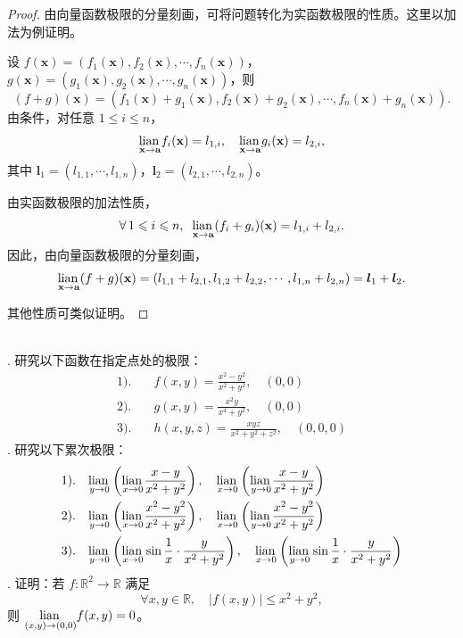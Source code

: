 \documentclass[12pt,UTF8,fontset=none]{ctexbook}
\begin{document}
\begin{proof}
由向量函数极限的分量刻画，可将问题转化为实函数极限的性质。这里以加法为例证明。

设 $f(\mathbf{x}) = (f_1(\mathbf{x}), f_2(\mathbf{x}), \cdots, f_n(\mathbf{x}))$，$g(\mathbf{x}) = (g_1(\mathbf{x}), g_2(\mathbf{x}), \cdots, g_n(\mathbf{x}))$，则
$$ (f + g)(\mathbf{x}) = (f_1(\mathbf{x}) + g_1(\mathbf{x}), f_2(\mathbf{x}) + g_2(\mathbf{x}), \cdots, f_n(\mathbf{x}) + g_n(\mathbf{x})). $$
由条件，对任意 $1 \leqslant i \leqslant n$，
$$ \underset{\mathbf{x}\to \mathbf{a}}{\operatorname{lian}\,} f_i(\mathbf{x}) = l_{1,i}, \quad \underset{\mathbf{x}\to \mathbf{a}}{\operatorname{lian}\,} g_i(\mathbf{x}) = l_{2,i}, $$
其中 $\boldsymbol{l}_1 = (l_{1,1}, \cdots, l_{1,n})$，$\boldsymbol{l}_2 = (l_{2,1}, \cdots, l_{2,n})$。

由实函数极限的加法性质，
$$ \forall \, 1 \leqslant i \leqslant n, \;\; \underset{\mathbf{x}\to \mathbf{a}}{\operatorname{lian}\,} (f_i + g_i)(\mathbf{x}) = l_{1,i} + l_{2,i}. $$
因此，由向量函数极限的分量刻画，
$$ \underset{\mathbf{x}\to \mathbf{a}}{\operatorname{lian}\,} (f + g)(\mathbf{x}) = (l_{1,1} + l_{2,1}, l_{1,2} + l_{2,2}, \cdots, l_{1,n} + l_{2,n}) = \boldsymbol{l}_1 + \boldsymbol{l}_2. $$

其他性质可类似证明。
\end{proof}

\begin{xt}
\mbox{} \\
. 研究以下函数在指定点处的极限：
\begin{align*}
1).& \quad f(x, y) = \frac{x^2-y^2}{x^2+y^2}, \quad (0, 0) \\
2).& \quad g(x, y) = \frac{x^2y}{x^4+y^2}, \quad (0, 0) \\
3).& \quad h(x, y, z) = \frac{xyz}{x^2+y^2+z^2}, \quad (0, 0, 0)
\end{align*}
. 研究以下累次极限：
\begin{align*}
1).& \quad \underset{y\to 0}{\operatorname{lian}\,} \left(\underset{x\to 0}{\operatorname{lian}\,} \frac{x-y}{x^2+y^2}\right), \quad \underset{x\to 0}{\operatorname{lian}\,} \left(\underset{y\to 0}{\operatorname{lian}\,} \frac{x-y}{x^2+y^2}\right) \\
2).& \quad \underset{y\to 0}{\operatorname{lian}\,} \left(\underset{x\to 0}{\operatorname{lian}\,} \frac{x^2-y^2}{x^2+y^2}\right), \quad \underset{x\to 0}{\operatorname{lian}\,} \left(\underset{y\to 0}{\operatorname{lian}\,} \frac{x^2-y^2}{x^2+y^2}\right) \\
3).& \quad \underset{y\to 0}{\operatorname{lian}\,} \left(\underset{x\to 0}{\operatorname{lian}\,} \sin{\frac{1}{x}} \cdot \frac{y}{x^2+y^2}\right), \quad \underset{x\to 0}{\operatorname{lian}\,} \left(\underset{y\to 0}{\operatorname{lian}\,} \sin{\frac{1}{x}} \cdot \frac{y}{x^2+y^2}\right)
\end{align*}
. 证明：若 $f: \mathbb{R}^2 \to \mathbb{R}$ 满足
$$ \forall x, y \in \mathbb{R}, \quad |f(x, y)| \leq x^2 + y^2, $$
则 $\underset{(x,y)\to (0,0)}{\operatorname{lian}\,} f(x, y) = 0$。
\end{xt}
\end{document}
